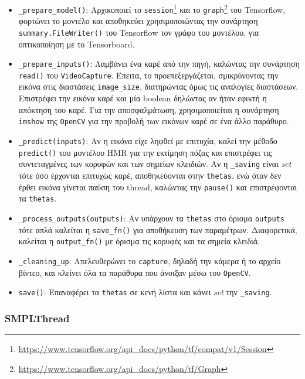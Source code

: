 \begin{itemize}
	\item \texttt{\_prepare\_model()}: Αρχικοποιεί το \texttt{session}\footnote{\href{https://www.tensorflow.org/api\_docs/python/tf/compat/v1/Session}{https://www.tensorflow.org/api\_docs/python/tf/compat/v1/Session}} και το \texttt{graph}\footnote{\href{https://www.tensorflow.org/api\_docs/python/tf/Graph}{https://www.tensorflow.org/api\_docs/python/tf/Graph}} του Tensorflow, φορτώνει το μοντέλο και αποθηκεύει χρησιμοποιώντας την συνάρτηση \texttt{summary.FileWriter()} του Tensorflow τον γράφο του μοντέλου, για οπτικοποίηση με το Tensorboard.
	\item \texttt{\_prepare\_inputs()}: Λαμβάνει ένα καρέ από την πηγή, καλώντας την συνάρτηση \texttt{read()} του \texttt{VideoCapture}. Έπειτα, το προεπεξεργάζεται, σμικρύνοντας την εικόνα στις διαστάσεις \texttt{image\_size}, διατηρώντας όμως τις αναλογίες διαστάσεων. Επιστρέφει την εικόνα καρέ και μία boolean δηλώντας αν ήταν εφικτή η απόκτηση του καρέ. Για την αποσφαλμάτωση, χρησιμοποιείται η συνάρτηση \texttt{imshow} της \texttt{OpenCV} για την προβολή των εικόνων καρέ σε ένα άλλο παράθυρο.
	\item \texttt{\_predict(inputs)}: Αν η εικόνα είχε ληφθεί με επιτυχία, καλεί την μέθοδο \texttt{predict()} του μοντέλου HMR για την εκτίμηση πόζας και επιστρέφει τις συντεταγμένες των κορυφών και των σημείων κλειδιών. Αν η \texttt{\_saving} είναι \textsl{set} τότε όσο έρχονται επιτυχώς καρέ, αποθηκεύονται στην \texttt{thetas}, ενώ όταν δεν έρθει εικόνα γίνεται παύση του thread, καλώντας την \texttt{pause()} και επιστρέφονται τα \texttt{thetas}.
	\item \texttt{\_process\_outputs(outputs)}: Αν υπάρχουν τα \texttt{thetas} στο όρισμα \texttt{outputs} τότε απλά καλείται η \texttt{save\_fn()} για αποθήκευση των παραμέτρων. Διαφορετικά, καλείται η \texttt{output\_fn()} με όρισμα τις κορυφές και τα σημεία κλειδιά.
	\item \texttt{\_cleaning\_up}: Απελευθερώνει το \texttt{capture}, δηλαδή την κάμερα ή το αρχείο βίντεο, και κλείνει όλα τα παράθυρα που άνοιξαν μέσω του \texttt{OpenCV}.
	\item \texttt{save()}: Επαναφέρει τα \texttt{thetas} σε κενή λίστα και κάνει \textsl{set} την \texttt{\_saving}.
\end{itemize}


\newpage
\subsubsection{SMPLThread}
\label{sec:smpl_thread}

